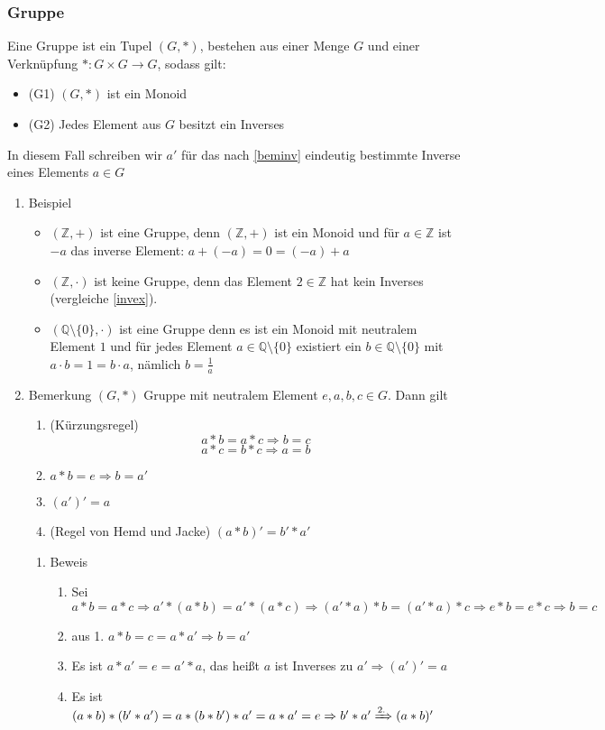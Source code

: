 \documentclass[11pt]{article}
\begin{document}
\subsubsection{Gruppe}
\label{sec-3-1-4}
Eine Gruppe ist ein Tupel $(G,*)$, bestehen aus einer Menge $G$ und einer Verknüpfung $*:G\times G \to G$, sodass gilt:
\begin{itemize}
\item (G1) $(G,*)$ ist ein Monoid
\item (G2) Jedes Element aus $G$ besitzt ein Inverses
\end{itemize}
In diesem Fall schreiben wir $a'$ für das nach \ref{beminv} eindeutig bestimmte Inverse eines Elements $a\in G$
\begin{enumerate}
\item Beispiel
\label{sec-3-1-4-1}
\begin{itemize}
\item $(\mathbb{Z},+)$ ist eine Gruppe, denn $(\mathbb{Z},+)$ ist ein Monoid und für $a\in\mathbb{Z}$ ist $-a$ das inverse Element: $a + (-a) = 0 = (-a) + a$
\item $(\mathbb{Z},\cdot)$ ist keine Gruppe, denn das Element $2\in\mathbb{Z}$ hat kein Inverses (vergleiche \ref{invex}).
\item $(\mathbb{Q}\setminus \{0\},\cdot)$ ist eine Gruppe denn es ist ein Monoid mit neutralem Element $1$ und für jedes Element $a\in\mathbb{Q}\setminus\{0\}$ existiert ein $b\in \mathbb{Q}\setminus \{0\}$ mit $a\cdot b = 1 = b\cdot a$, nämlich $b = \frac{1}{a}$
\end{itemize}
\item Bemerkung
\label{sec-3-1-4-2}
$(G,*)$ Gruppe mit neutralem Element $e,a,b,c \in G$. Dann gilt
\begin{enumerate}
\item (Kürzungsregel) \[a*b = a*c \Rightarrow b = c\] \[a*c = b * c \Rightarrow a = b\]
\item $a*b = e \Rightarrow b = a'$
\item $(a')' = a$
\item (Regel von Hemd und Jacke) $(a*b)' = b' * a'$
\end{enumerate}
\begin{enumerate}
\item Beweis
\label{sec-3-1-4-2-1}
\begin{enumerate}
\item Sei $a * b = a * c \Rightarrow a'*(a*b) = a'*(a*c) \Rightarrow (a'*a)*b=(a'*a)*c \Rightarrow e*b = e*c \Rightarrow b = c$
\item aus 1. $a*b = c = a*a' \Rightarrow b = a'$
\item Es ist $a*a' = e = a' * a$, das heißt $a$ ist Inverses zu $a' \Rightarrow (a')' = a$
\item Es ist $(a*b)*(b'*a') = a*(b*b')*a' = a*a' = e \Rightarrow b' * a' \xRightarrow{\text{2.}} (a *b)'$
\end{enumerate}
\end{enumerate}
\end{enumerate}
\end{document}

